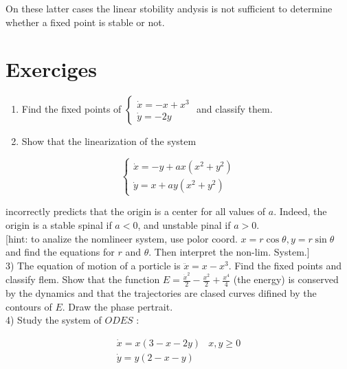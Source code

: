 \documentclass[10pt]{article}
\begin{document}
On these latter cases the linear stobility andysis is not sufficient to determine whether a fixed point is stable or not.

\section*{Exerciges}
\begin{enumerate}
  \item Find the fixed points of $\left\{\begin{array}{l}\dot{x}=-x+x^{3} \\ \dot{y}=-2 y\end{array}\right.$ and classify them.
  \item Show that the linearization of the system
\end{enumerate}

$$
\left\{\begin{array}{l}
\dot{x}=-y+a x\left(x^{2}+y^{2}\right) \\
\dot{y}=x+a y\left(x^{2}+y^{2}\right)
\end{array}\right.
$$

incorrectly predicts that the origin is a center for all values of $a$. Indeed, the origin is a stable spinal if $a<0$, and unstable pinal if $a>0$.\\[0pt]
[hint: to analize the nomlineer system, use polor coord. $x=r \cos \theta, y=r \sin \theta$ and find the equations for $r$ and $\theta$. Then interpret the non-lim. System.]\\
3) The equation of motion of a porticle is $\ddot{x}=x-x^{3}$. Find the fixed points and classify flem. Show that the function $E=\frac{\dot{x}^{2}}{2}-\frac{x^{2}}{2}+\frac{x^{4}}{4}$ (the energy) is conserved by the dynamics and that the trajectories are clased curves difined by the contours of $E$. Draw the phase pertrait.\\
4) Study the system of $O D E S$ :

$$
\begin{array}{ll}
\dot{x}=x(3-x-2 y) & x, y \geqslant 0 \\
\dot{y}=y(2-x-y) &
\end{array}
$$
\end{document}
